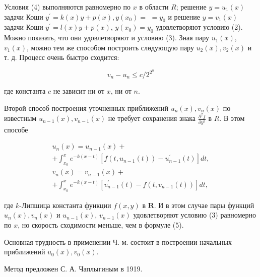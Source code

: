 \documentclass[10pt]{article}
\begin{document}
Условия (4) выполняются равномерно по $x$ в области $R$; решение $y=u_{1}(x)$ задачи Коши $y^{\prime}=k(x) y+p(x), y\left(x_{0}\right)=$ $=y_{0}$ и решение $y=v_{1}(x)$ задачи Коши $y^{\prime}=l(x) y+p(x)$, $y\left(x_{0}\right)=y_{0}$ удовлетворяют условию (2). Можно показать, что они удовлетворяют и условию (3). Зная пару $u_{1}(x)$, $v_{1}(x)$, можно тем же способом построить слөдующую пару $u_{2}(x), v_{2}(x)$ и т. д. Процесс очень быстро сходится:



\[

v_{n}-u_{n} \leqslant c / 2^{2^{n}}

\]



где константа $c$ не зависит ни от $x$, ни от $n$.



Второй способ построения уточненных приближений $u_{n}(x), v_{n}(x)$ по известным $u_{n-1}(x), v_{n-1}(x)$ не требует сохранения знака $\frac{\partial^{2} f}{\partial y^{2}}$ в $R$. В этом способе



\[

\begin{gathered}

u_{n}(x)=u_{n-1}(x)+ \\

+\int_{x_{0}}^{x} e^{-k(x-t)}\left[f\left(t, u_{n-1}(t)\right)-u_{n-1}^{\prime}(t)\right] d t, \\

v_{n}(x)=v_{n-1}(x)+ \\

+\int_{x_{0}}^{x} e^{-k(x-t)}\left[v_{n-1}^{\prime}(t)-f\left(t, v_{n-1}(t)\right)\right] d t,

\end{gathered}

\]



где $k$-Липшица константа функции $f(x, y)$ в $\boldsymbol{R}$. И в этом случае пары функций $u_{n}(x), v_{n}(x)$ и $u_{n-1}(x)$, $v_{n-1}(x)$ удовлетворяют условию (3) равномерно по $x$, но скорость сходимости меньше, чем в формуле (5).



Основная трудность в применении Ч. м. состоит в построении начальных приближений $u_{0}(x), v_{0}(x)$.



Метод предложен С. А. Чаплыгиным в 1919.
\end{document}

